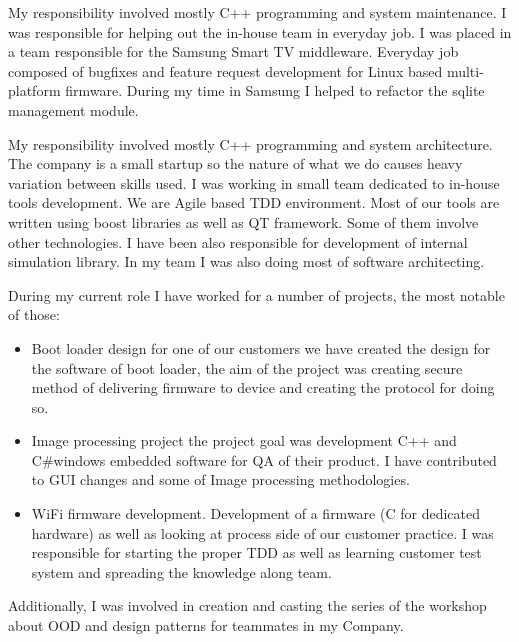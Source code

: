 \documentclass[8pt,a4paper]{moderncv}
\begin{document}
\vspace{4mm}
My responsibility involved mostly C++ programming and system maintenance. I was responsible for helping out
the in-house team in everyday job. I was placed in a team responsible for the Samsung Smart TV middleware. Everyday job composed of bugfixes and feature request development for Linux based multi-platform firmware.
During my time in Samsung I helped to refactor the sqlite management module.
\cvline{}{}

\vspace{4mm}
My responsibility involved mostly C++ programming and system architecture. The company is a small startup
so the nature of what we do causes heavy variation between skills used. I was working in small team
dedicated to in-house tools development. We are Agile based TDD environment. Most of our tools are
written using boost libraries as well as QT framework. Some of them involve other technologies. I have been
also responsible for development of internal simulation library. In my team I was also doing most of
software architecting.
\cvline{}{}

\vspace{4mm}
During my current role I have worked for a number of projects, the most notable of those:
\begin{itemize}
\item Boot loader design for one of our customers we have created the design for the software of boot loader, the aim of the project was creating secure method of delivering firmware to device and creating the protocol for doing so.
\item Image processing project the project goal was development C++ and C\#windows embedded software for QA of their product. I have contributed to GUI changes and some of Image processing methodologies.
\item WiFi firmware development. Development of a firmware (C for dedicated hardware) as well as looking at process side of our customer practice. I was responsible for starting the proper TDD as well as learning customer test system and spreading the knowledge along team.
\end{itemize}
Additionally, I was involved in creation and casting the series of the workshop about OOD and design patterns for
teammates in my Company.
\cvline{}{}
\end{document}
